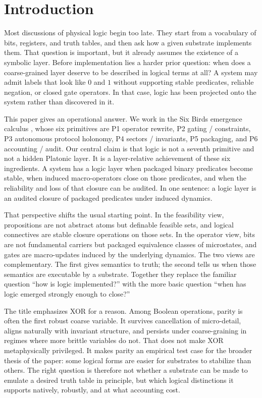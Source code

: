\documentclass[11pt]{article}
\theoremstyle{definition}
\begin{document}
\section{Introduction}
\label{sec:introduction}

Most discussions of physical logic begin too late. They start from a vocabulary of bits, registers, and truth tables, and then ask how a given substrate implements them. That question is important, but it already assumes the existence of a symbolic layer. Before implementation lies a harder prior question: when does a coarse-grained layer deserve to be described in logical terms at all? A system may admit labels that look like \(0\) and \(1\) without supporting stable predicates, reliable negation, or closed gate operators. In that case, logic has been projected onto the system rather than discovered in it.

This paper gives an operational answer. We work in the Six Birds emergence calculus \cite{tsiokos2026sixbirds}, whose six primitives are P1 operator rewrite, P2 gating / constraints, P3 autonomous protocol holonomy, P4 sectors / invariants, P5 packaging, and P6 accounting / audit. Our central claim is that logic is not a seventh primitive and not a hidden Platonic layer. It is a layer-relative achievement of these six ingredients. A system has a logic layer when packaged binary predicates become stable, when induced macro-operators close on those predicates, and when the reliability and loss of that closure can be audited. In one sentence: a logic layer is an audited closure of packaged predicates under induced dynamics.

That perspective shifts the usual starting point. In the feasibility view, propositions are not abstract atoms but definable feasible sets, and logical connectives are stable closure operations on those sets. In the operator view, bits are not fundamental carriers but packaged equivalence classes of microstates, and gates are macro-updates induced by the underlying dynamics. The two views are complementary. The first gives semantics to truth; the second tells us when those semantics are executable by a substrate. Together they replace the familiar question ``how is logic implemented?'' with the more basic question ``when has logic emerged strongly enough to close?''

The title emphasizes XOR for a reason. Among Boolean operations, parity is often the first robust coarse variable. It survives cancellation of micro-detail, aligns naturally with invariant structure, and persists under coarse-graining in regimes where more brittle variables do not. That does not make XOR metaphysically privileged. It makes parity an empirical test case for the broader thesis of the paper: some logical forms are easier for substrates to stabilize than others. The right question is therefore not whether a substrate can be made to emulate a desired truth table in principle, but which logical distinctions it supports natively, robustly, and at what accounting cost.
\end{document}
